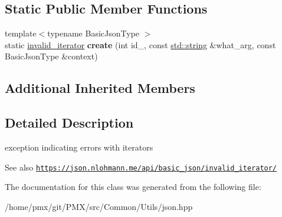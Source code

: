 \subsection*{Static Public Member Functions}
\begin{DoxyCompactItemize}
\item 
\mbox{\label{classnlohmann_1_1detail_1_1invalid__iterator_a34104b98ab00564e564176b4d2ba7c3c}} 
{\footnotesize template$<$typename Basic\+Json\+Type $>$ }\\static \hyperlink{classnlohmann_1_1detail_1_1invalid__iterator}{invalid\+\_\+iterator} {\bfseries create} (int id\+\_\+, const \hyperlink{namespacenlohmann_1_1detail_a1ed8fc6239da25abcaf681d30ace4985ab45cffe084dd3d20d928bee85e7b0f21}{std\+::string} \&what\+\_\+arg, const Basic\+Json\+Type \&context)
\end{DoxyCompactItemize}
\subsection*{Additional Inherited Members}


\subsection{Detailed Description}
exception indicating errors with iterators 

\begin{DoxySeeAlso}{See also}
\href{https://json.nlohmann.me/api/basic_json/invalid_iterator/}{\tt https\+://json.\+nlohmann.\+me/api/basic\+\_\+json/invalid\+\_\+iterator/} 
\end{DoxySeeAlso}


The documentation for this class was generated from the following file\+:\begin{DoxyCompactItemize}
\item 
/home/pmx/git/\+P\+M\+X/src/\+Common/\+Utils/json.\+hpp\end{DoxyCompactItemize}
